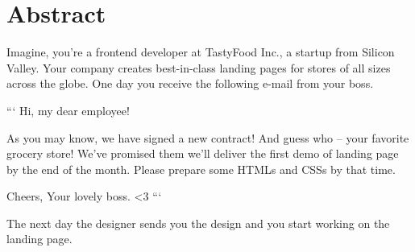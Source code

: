 \chapter*{Abstract}
\par Imagine, you're a frontend developer at TastyFood Inc., a startup from Silicon Valley. Your company creates best-in-class landing pages for stores of all sizes across the globe. One day you receive the following e-mail from your boss.

```
Hi, my dear employee!

As you may know, we have signed a new contract! And guess who -- your favorite grocery store!
We've promised them we'll deliver the first demo of landing page by the end of the month. Please prepare some HTMLs and CSSs by that time.

Cheers,
Your lovely boss. <3
```

The next day the designer sends you the design and you start working on the landing page.

\clearpage